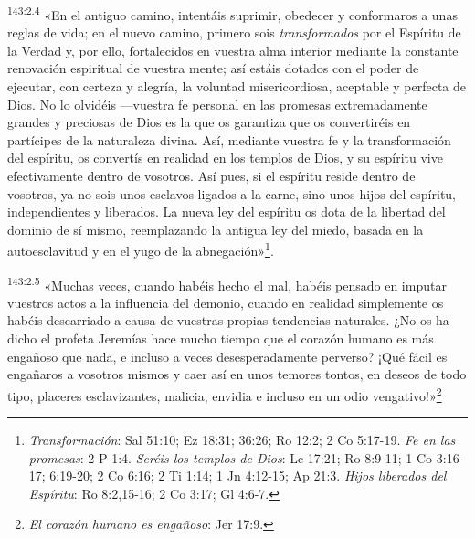 \par 
\textsuperscript{143:2.4} «En el antiguo camino, intentáis suprimir, obedecer y conformaros a unas reglas de vida; en el nuevo camino, primero sois \textit{transformados} por el Espíritu de la Verdad y, por ello, fortalecidos en vuestra alma interior mediante la constante renovación espiritual de vuestra mente; así estáis dotados con el poder de ejecutar, con certeza y alegría, la voluntad misericordiosa, aceptable y perfecta de Dios. No lo olvidéis ---vuestra fe personal en las promesas extremadamente grandes y preciosas de Dios es la que os garantiza que os convertiréis en partícipes de la naturaleza divina. Así, mediante vuestra fe y la transformación del espíritu, os convertís en realidad en los templos de Dios, y su espíritu vive efectivamente dentro de vosotros. Así pues, si el espíritu reside dentro de vosotros, ya no sois unos esclavos ligados a la carne, sino unos hijos del espíritu, independientes y liberados. La nueva ley del espíritu os dota de la libertad del dominio de sí mismo, reemplazando la antigua ley del miedo, basada en la autoesclavitud y en el yugo de la abnegación»\footnote{\textit{Transformación}: Sal 51:10; Ez 18:31; 36:26; Ro 12:2; 2 Co 5:17-19. \textit{Fe en las promesas}: 2 P 1:4. \textit{Seréis los templos de Dios}: Lc 17:21; Ro 8:9-11; 1 Co 3:16-17; 6:19-20; 2 Co 6:16; 2 Ti 1:14; 1 Jn 4:12-15; Ap 21:3. \textit{Hijos liberados del Espíritu}: Ro 8:2,15-16; 2 Co 3:17; Gl 4:6-7.}.

\par 
\textsuperscript{143:2.5} «Muchas veces, cuando habéis hecho el mal, habéis pensado en imputar vuestros actos a la influencia del demonio, cuando en realidad simplemente os habéis descarriado a causa de vuestras propias tendencias naturales. ¿No os ha dicho el profeta Jeremías hace mucho tiempo que el corazón humano es más engañoso que nada, e incluso a veces desesperadamente perverso? ¡Qué fácil es engañaros a vosotros mismos y caer así en unos temores tontos, en deseos de todo tipo, placeres esclavizantes, malicia, envidia e incluso en un odio vengativo!»\footnote{\textit{El corazón humano es engañoso}: Jer 17:9.}

